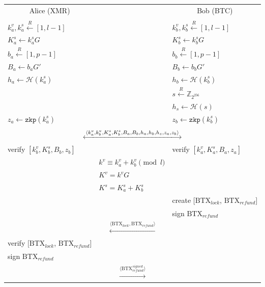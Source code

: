 \documentclass{llncs}
\renewcommand{\arraystretch}{1.5}
\begin{document}
\begin{figure}[T]
    \begin{table}[H]
      \centering
      {\renewcommand{\arraystretch}{1.2}%
      \begin{tabular}{ | l l l | }
        \hline
          \multicolumn{1}{|c}{Alice (XMR)} &  & \multicolumn{1}{c|}{Bob (BTC)} \\
          & & \\
          $k^v_a, k^s_a \xleftarrow{R} [1, l-1]$ & & $k^v_b, k^s_b \xleftarrow{R} [1, l-1]$ \\
          $K^s_a \leftarrow k^s_aG$ & & $K^s_b \leftarrow k^s_bG$ \\
          $b_a \xleftarrow{R} [1, p-1]$ & & $b_b \xleftarrow{R} [1, p-1]$ \\
          $B_a \leftarrow b_aG'$ & & $B_b \leftarrow b_bG'$ \\
          $h_a \leftarrow \mathcal{H}(k^s_a)$ & & $h_b \leftarrow \mathcal{H}(k^s_b)$ \\
          & & $s \xleftarrow{R} \mathbb{Z}_{2^{256}}$ \\
          & & $h_s \leftarrow \mathcal{H}(s)$ \\
          $z_a \leftarrow \texttt{zkp}(k^s_a)$ & & $z_b \leftarrow \texttt{zkp}(k^s_b)$ \\
           & & \\
          \multicolumn{3}{|c|}{$\xlongleftrightarrow{\langle k^v_a, k^v_b, K^s_a, K^s_b, B_a, B_b, h_a, h_b, h_s, z_a, z_b \rangle}$} \\
          verify $[k^v_b, K^s_b, B_b, z_b]$ & & verify $[k^v_a, K^s_a, B_a, z_a]$ \\
          & $k^v \equiv k^v_a + k^v_b \pmod l$ & \\
          & $K^v = k^vG$ & \\
          & $K^s = K^s_a + K^s_b$ & \\
          & & create $[\text{BTX}_\textit{lock}$, $\text{BTX}_\textit{refund}]$ \\
          & & sign $\text{BTX}_\textit{refund}$ \\
          \multicolumn{3}{|c|}{$\xleftarrow{\langle \text{BTX}_\textit{lock}, \text{BTX}_\textit{refund} \rangle}$} \\
          verify $[\text{BTX}_\textit{lock}$, $\text{BTX}_\textit{refund}]$ & & \\
          sign $\text{BTX}_\textit{refund}$ & & \\
          \multicolumn{3}{|c|}{$\xrightarrow{\langle \text{BTX}_\textit{refund}^\textit{signed} \rangle}$} \\

\end{tabular}}
\end{table}
\end{figure}
\end{document}
